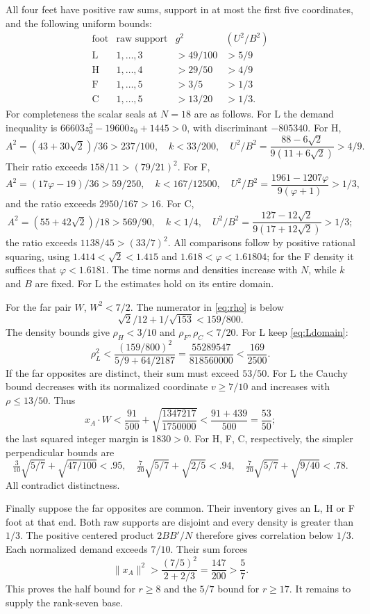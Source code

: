 \documentclass[11pt]{article}
\theoremstyle{remark}
\newcommand{\ph}{\varphi}
\begin{document}
All four feet have positive raw sums, support in at most the first
five coordinates, and the following uniform bounds:
\[
\begin{array}{c|c|c|c}
 \text{foot}&\text{raw support}&g^2&(U^2/B^2)\\ \hline
 \mathrm L&1,\ldots,3&>49/100&>5/9\\
 \mathrm H&1,\ldots,4&>29/50&>4/9\\
 \mathrm F&1,\ldots,5&>3/5&>1/3\\
 \mathrm C&1,\ldots,5&>13/20&>1/3.
\end{array}
\]
For completeness the scalar seals at \(N=18\) are as follows.
For L the demand inequality is
\(66603z_0^2-19600z_0+1445>0\), with discriminant \(-805340\).
For H,
\[
 A^2=(43+30\sqrt2)/36>237/100,\quad
 k<33/200,\quad
 U^2/B^2=\frac{88-6\sqrt2}{9(11+6\sqrt2)}>4/9.
\]
Their ratio exceeds \(158/11>(79/21)^2\).
For F,
\[
 A^2=(17\ph-19)/36>59/250,\quad k<167/12500,\quad
 U^2/B^2=\frac{1961-1207\ph}{9(\ph+1)}>1/3,
\]
and the ratio exceeds \(2950/167>16\).
For C,
\[
 A^2=(55+42\sqrt2)/18>569/90,\quad k<1/4,\quad
 U^2/B^2=\frac{127-12\sqrt2}{9(17+12\sqrt2)}>1/3;
\]
the ratio exceeds \(1138/45>(33/7)^2\).
All comparisons follow by positive rational squaring, using
\(1.414<\sqrt2<1.415\) and \(1.618<\ph<1.61804\);
for the F density it suffices that \(\ph<1.6181\).
The time norms and densities increase with \(N\), while \(k\)
and \(B\) are fixed. For L the estimates hold on its entire domain.

For the far pair \(W\), \(W^2<7/2\). The numerator in
\eqref{eq:rho} is below
\[
 \sqrt2/12+1/\sqrt{153}<159/800.
\]
The density bounds give \(\rho_H<3/10\) and
\(\rho_F,\rho_C<7/20\). For L keep \eqref{eq:Ldomain}:
\[
 \rho_L^2<
 \frac{(159/800)^2}{5/9+64/2187}
 =\frac{55289547}{818560000}<\frac{169}{2500}.
\]
If the far opposites are distinct, their sum must exceed \(53/50\).
For L the Cauchy bound decreases with its normalized coordinate
\(v\ge7/10\) and increases with \(\rho\le13/50\). Thus
\[
 x_A\cdot W<
 \frac{91}{500}+
 \sqrt{\frac{1347217}{1750000}}
 <\frac{91+439}{500}=\frac{53}{50};
\]
the last squared integer margin is \(1830>0\).
For H, F, C, respectively, the simpler perpendicular bounds are
\[
 \tfrac3{10}\sqrt{5/7}+\sqrt{47/100}<.95,\quad
 \tfrac7{20}\sqrt{5/7}+\sqrt{2/5}<.94,\quad
 \tfrac7{20}\sqrt{5/7}+\sqrt{9/40}<.78 .
\]
All contradict distinctness.

Finally suppose the far opposites are common. Their inventory gives
an L, H or F foot at that end. Both raw supports are disjoint and
every density is greater than \(1/3\). The positive centered product
\(2BB'/N\) therefore gives correlation below \(1/3\).
Each normalized demand exceeds \(7/10\). Their sum forces
\[
 \|x_A\|^2>\frac{(7/5)^2}{2+2/3}
          =\frac{147}{200}>\frac57 .
\]
This proves the half bound for $r\ge8$ and the $5/7$ bound for
$r\ge17$. It remains to supply the rank-seven base.
\end{document}
